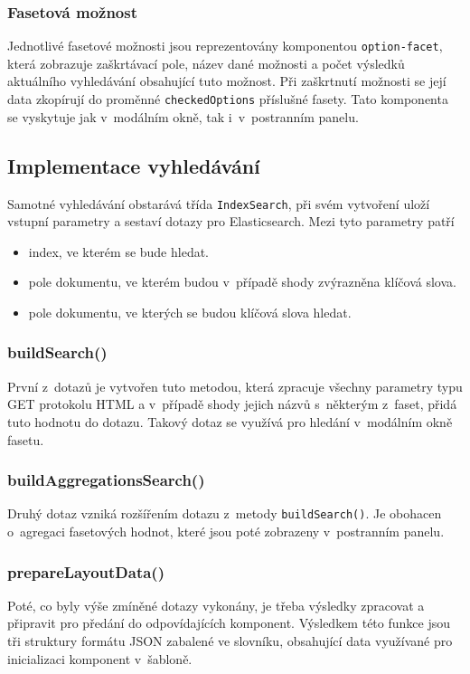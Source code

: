 \subsubsection*{Fasetová možnost}
Jednotlivé fasetové možnosti jsou reprezentovány komponentou \texttt{option-facet}, která zobrazuje zaškrtávací pole, název dané možnosti a počet výsledků aktuálního vyhledávání obsahující tuto možnost. Při zaškrtnutí možnosti se její data zkopírují do proměnné \texttt{checkedOptions} příslušné fasety. Tato komponenta se vyskytuje jak v~modálním okně, tak i~v~postranním panelu.

\subsection{Implementace vyhledávání}\label{section:search}
Samotné vyhledávání obstarává třída \texttt{IndexSearch}, při svém vytvoření uloží vstupní parametry a sestaví dotazy pro Elasticsearch. Mezi tyto parametry patří
\begin{itemize}
    \item index, ve kterém se bude hledat.
    \item pole dokumentu, ve kterém budou v~případě shody zvýrazněna klíčová slova.
    \item pole dokumentu, ve kterých se budou klíčová slova hledat.
\end{itemize}
\subsubsection*{buildSearch()}
První z~dotazů je vytvořen tuto metodou, která zpracuje všechny parametry typu GET protokolu HTML a v~případě shody jejich názvů s~některým z~faset, přidá tuto hodnotu do dotazu. Takový dotaz se využívá pro hledání v~modálním okně fasetu. 

\subsubsection*{buildAggregationsSearch()}
Druhý dotaz vzniká rozšířením dotazu z~metody \texttt{buildSearch()}. Je obohacen o~agregaci fasetových hodnot, které jsou poté zobrazeny v~postranním panelu.

\subsubsection*{prepareLayoutData()}
Poté, co byly výše zmíněné dotazy vykonány, je třeba výsledky zpracovat a připravit pro předání do odpovídajících komponent. Výsledkem této funkce jsou tři struktury formátu JSON zabalené ve slovníku, obsahující data využívané pro inicializaci komponent v~šabloně.

